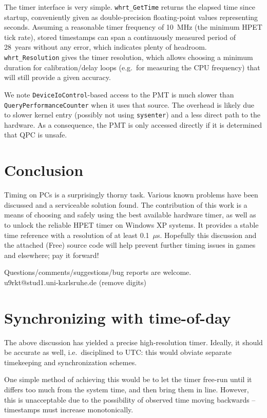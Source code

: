 \documentclass[a4paper,12pt,pdftex]{article}
\newcommand{\id}[1]{\texttt{#1}}
\begin{document}
The timer interface is very simple. \id{whrt\_GetTime} returns the elapsed time since startup, conveniently given as double-precision floating-point values representing seconds. Assuming a reasonable timer frequency of 10~MHz (the minimum HPET tick rate), stored timestamps can span a continuously measured period of 28~years without any error, which indicates plenty of headroom. \id{whrt\_Resolution} gives the timer resolution, which allows choosing a minimum duration for calibration/delay loops (e.g.\ for measuring the CPU frequency) that will still provide a given accuracy. 

We note \id{DeviceIoControl}-based access to the PMT is much slower than \id{QueryPerformanceCounter} when it uses that source. The overhead is likely due to slower kernel entry (possibly not using \id{sysenter}) and a less direct path to the hardware. As a consequence, the PMT is only accessed directly if it is determined that QPC is unsafe.


\section{Conclusion}
\label{sec:conclusion}

Timing on PCs is a surprisingly thorny task. Various known problems have been discussed and a serviceable solution found. The contribution of this work is a means of choosing and safely using the best available hardware timer, as well as to unlock the reliable HPET timer on Windows XP systems. It provides a stable time reference with a resolution of at least 0.1~$\mu$s.
Hopefully this discussion and the attached (Free) source code will help prevent further timing issues in games and elsewhere; pay it forward!

Questions/comments/suggestions/bug reports are welcome.\\
u9rkt@stud1.uni-karlsruhe.de (remove digits)

\appendix

\section{Synchronizing with time-of-day}

\label{sec:syncUTC}

The above discussion has yielded a precise high-resolution timer. Ideally, it should be accurate as well, i.e.\ disciplined to UTC: this would obviate separate timekeeping and synchronization schemes.

One simple method of achieving this would be to let the timer free-run until it differs too much from the system time, and then bring them in line. However, this is unacceptable due to the possibility of observed time moving backwards -- timestamps must increase monotonically.
\end{document}
